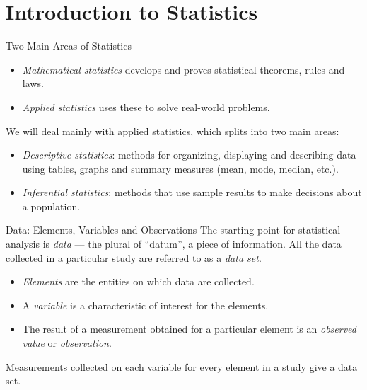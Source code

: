 \documentclass[10pt,aspectratio=169]{beamer}
\begin{document}
\section{Introduction to Statistics}

\begin{frame}{Two Main Areas of Statistics}
  \begin{itemize}
    \item \emph{Mathematical statistics} develops and proves statistical
          theorems, rules and laws.
    \item \emph{Applied statistics} uses these to solve real-world problems.
  \end{itemize}

  \vspace{0.8em}
  We will deal mainly with applied statistics, which splits into two main areas:
  \begin{itemize}
    \item \emph{Descriptive statistics}: methods for organizing, displaying and
          describing data using tables, graphs and summary measures (mean, mode,
          median, etc.).
    \item \emph{Inferential statistics}: methods that use sample results to make
          decisions about a population.
  \end{itemize}
\end{frame}

\begin{frame}{Data: Elements, Variables and Observations}
  The starting point for statistical analysis is \emph{data} --- the plural of
  ``datum'', a piece of information. All the data collected in a particular
  study are referred to as a \emph{data set}.

  \vspace{0.6em}
  \begin{itemize}
    \item \emph{Elements} are the entities on which data are collected.
    \item A \emph{variable} is a characteristic of interest for the elements.
    \item The result of a measurement obtained for a particular element is an
          \emph{observed value} or \emph{observation}.
  \end{itemize}

  \vspace{0.6em}
  Measurements collected on each variable for every element in a study give a
  data set.
\end{frame}
\end{document}
